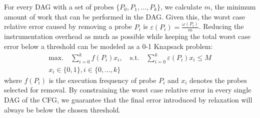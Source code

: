 
For every DAG with a set of probes $\{P_0, P_1, \ldots, P_k\}$, we calculate $m$, the minimum amount of work that can be performed in the
DAG. Given this, the worst case relative error caused by removing a probe $P_i$ is $\varepsilon(P_i) = \frac{\omega(P_i)}{m}$. Reducing the
instrumentation overhead as much as possible while keeping the total worst case error below a threshold can be modeled as a 0-1 Knapsack
problem:
\begin{gather*}
\textrm{max.}\quad\sum_{i=0}^{k} f(P_i)x_i,\quad
\textrm{s.t.}\quad\sum_{i=0}^{k} \varepsilon(P_i)x_i \leq M \\
x_i\in\{0,1\}, i\in\{0,\ldots,k\}
\end{gather*}
where $f(P_i)$ is the execution frequency of probe $P_i$ and $x_i$ denotes the probes selected for removal. By constraining the worst case
relative error in every single DAG of the CFG, we guarantee that the final error introduced by relaxation will always be below the chosen
threshold.
%
